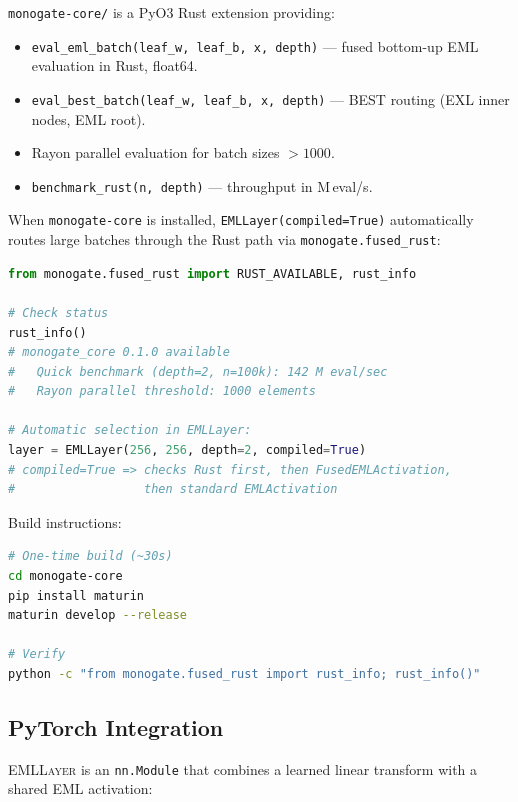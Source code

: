 \documentclass[11pt,a4paper]{article}
\begin{document}
\texttt{monogate-core/} is a PyO3 Rust extension providing:

\begin{itemize}
  \item \texttt{eval\_eml\_batch(leaf\_w, leaf\_b, x, depth)} ---
    fused bottom-up EML evaluation in Rust, float64.
  \item \texttt{eval\_best\_batch(leaf\_w, leaf\_b, x, depth)} ---
    BEST routing (EXL inner nodes, EML root).
  \item Rayon parallel evaluation for batch sizes $>1000$.
  \item \texttt{benchmark\_rust(n, depth)} --- throughput in M\,eval/s.
\end{itemize}

When \texttt{monogate-core} is installed, \texttt{EMLLayer(compiled=True)}
automatically routes large batches through the Rust path via
\texttt{monogate.fused\_rust}:

\begin{lstlisting}[language=Python]
from monogate.fused_rust import RUST_AVAILABLE, rust_info

# Check status
rust_info()
# monogate_core 0.1.0 available
#   Quick benchmark (depth=2, n=100k): 142 M eval/sec
#   Rayon parallel threshold: 1000 elements

# Automatic selection in EMLLayer:
layer = EMLLayer(256, 256, depth=2, compiled=True)
# compiled=True => checks Rust first, then FusedEMLActivation,
#                  then standard EMLActivation
\end{lstlisting}

Build instructions:
\begin{lstlisting}[language=bash]
# One-time build (~30s)
cd monogate-core
pip install maturin
maturin develop --release

# Verify
python -c "from monogate.fused_rust import rust_info; rust_info()"
\end{lstlisting}

\subsection{PyTorch Integration}

\textsc{EMLLayer} is an \texttt{nn.Module} that combines a learned
linear transform with a shared EML activation:
\end{document}
